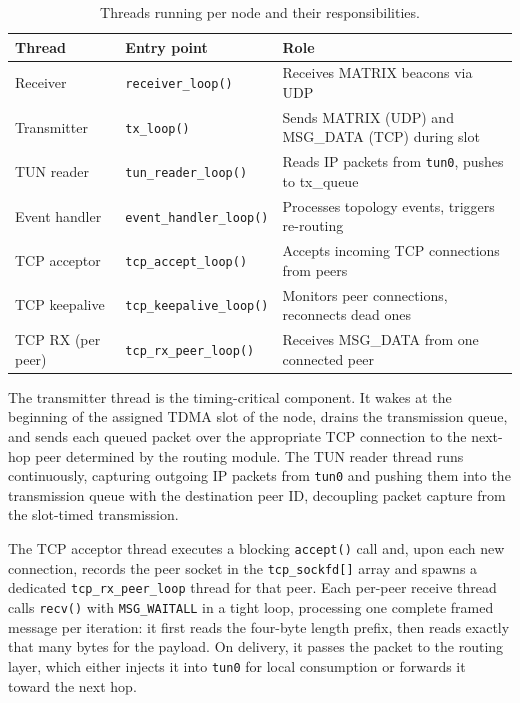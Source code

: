 \begin{table}[H]
\centering
\caption{Threads running per node and their responsibilities.}
\label{tab:threads}
\begin{tabular}{ll>{\raggedright\arraybackslash}p{6cm}}
\toprule
\textbf{Thread} & \textbf{Entry point} & \textbf{Role} \\
\midrule
Receiver          & \texttt{receiver\_loop()}        & Receives MATRIX beacons via UDP \\
Transmitter       & \texttt{tx\_loop()}               & Sends MATRIX (UDP) and MSG\_DATA (TCP) during slot \\
TUN reader        & \texttt{tun\_reader\_loop()}      & Reads IP packets from \texttt{tun0}, pushes to tx\_queue \\
Event handler     & \texttt{event\_handler\_loop()}   & Processes topology events, triggers re-routing \\
TCP acceptor      & \texttt{tcp\_accept\_loop()}      & Accepts incoming TCP connections from peers \\
TCP keepalive     & \texttt{tcp\_keepalive\_loop()}   & Monitors peer connections, reconnects dead ones \\
TCP RX (per peer) & \texttt{tcp\_rx\_peer\_loop()}    & Receives MSG\_DATA from one connected peer \\
\bottomrule
\end{tabular}
\end{table}

The transmitter thread is the timing-critical component. It wakes at the beginning of the
assigned TDMA slot of the node, drains the transmission queue, and sends each queued packet
over the appropriate TCP connection to the next-hop peer determined by the routing module.
The TUN reader thread runs continuously, capturing outgoing IP packets from \texttt{tun0} and
pushing them into the transmission queue with the destination peer ID, decoupling packet
capture from the slot-timed transmission.

The TCP acceptor thread executes a blocking \texttt{accept()} call and, upon each new
connection, records the peer socket in the \texttt{tcp\_sockfd[]} array and spawns a dedicated
\texttt{tcp\_rx\_peer\_loop} thread for that peer. Each per-peer receive thread calls
\texttt{recv()} with \texttt{MSG\_WAITALL} in a tight loop, processing one complete framed
message per iteration: it first reads the four-byte length prefix, then reads exactly that many
bytes for the payload. On delivery, it passes the packet to the routing layer, which either
injects it into \texttt{tun0} for local consumption or forwards it toward the next hop.

